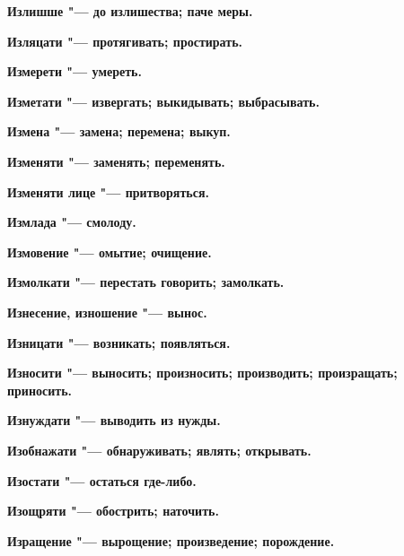 \bfseries Излишше \normalfont{} "--- до излишества; паче меры. 




\bfseries Изляцати \normalfont{} "--- протягивать; простирать. 




\bfseries Измерети \normalfont{} "--- умереть. 




\bfseries Изметати \normalfont{} "--- извергать; выкидывать; выбрасывать. 




\bfseries Измена \normalfont{} "--- замена; перемена; выкуп. 




\bfseries Изменяти \normalfont{} "--- заменять; переменять. 




\bfseries Изменяти лице \normalfont{} "--- притворяться. 




\bfseries Измлада \normalfont{} "--- смолоду. 




\bfseries Измовение \normalfont{} "--- омытие; очищение. 




\bfseries Измолкати \normalfont{} "--- перестать говорить; замолкать. 




\bfseries Изнесение, изношение \normalfont{} "--- вынос. 




\bfseries Изницати \normalfont{} "--- возникать; появляться. 




\bfseries Износити \normalfont{} "--- выносить; произносить; производить; произращать; приносить. 




\bfseries Изнуждати \normalfont{} "--- выводить из нужды. 




\bfseries Изобнажати \normalfont{} "--- обнаруживать; являть; открывать. 




\bfseries Изостати \normalfont{} "--- остаться где-либо. 




\bfseries Изощряти \normalfont{} "--- обострить; наточить. 




\bfseries Изращение \normalfont{} "--- вырощение; произведение; порождение. 




